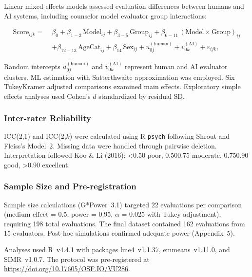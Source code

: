 \documentclass{wiley-article}
\begin{document}
Linear mixed-effects models assessed evaluation differences between humans and AI systems, including counselor model \texttimes{} evaluator group interactions:

\begin{equation}
\begin{aligned}
\mathrm{Score}_{ijk} =\;&
\beta_{0}
+\beta_{1-2}\,\mathrm{Model}_{ij}
+\beta_{3-5}\,\mathrm{Group}_{ij}
+\beta_{6-11}\,(\mathrm{Model}\times\mathrm{Group})_{ij}\\
&+\beta_{12-13}\,\mathrm{AgeCat}_{ij}
+\beta_{14}\,\mathrm{Sex}_{ij}
+u^{(\mathrm{human})}_{0j}
+v^{(\mathrm{AI})}_{0k}
+\varepsilon_{ijk},
\end{aligned}
\end{equation}

Random intercepts $u^{(\mathrm{human})}_{0j}$ and $v^{(\mathrm{AI})}_{0k}$ represent human and AI evaluator clusters. ML estimation with Satterthwaite approximation was employed. Six Tukey\textendash{}Kramer adjusted comparisons examined main effects. Exploratory simple effects analyses used Cohen's $d$ standardized by residual SD.

\subsubsection*{Inter-rater Reliability}

ICC(2,1) and ICC(2,$k$) were calculated using \textsf{R} \texttt{psych} following Shrout and Fleiss's Model~2. Missing data were handled through pairwise deletion. Interpretation followed Koo \& Li (2016): <0.50 poor, 0.50\textendash{}0.75 moderate, 0.75\textendash{}0.90 good, >0.90 excellent.

\subsubsection*{Sample Size and Pre-registration}

Sample size calculations (\textsf{G*Power}~3.1) targeted 22 evaluations per comparison (medium effect = 0.5, power = 0.95, $\alpha$ = 0.025 with Tukey adjustment), requiring 198 total evaluations. The final dataset contained 162 evaluations from 15 evaluators. Post-hoc simulations confirmed adequate power (Appendix~5). 

Analyses used \textsf{R}~v4.4.1 with packages \textsf{lme4}~v1.1.37, \textsf{emmeans}~v1.11.0, and \textsf{SIMR}~v1.0.7. The protocol was pre-registered at \url{https://doi.org/10.17605/OSF.IO/VU286}.
\end{document}
